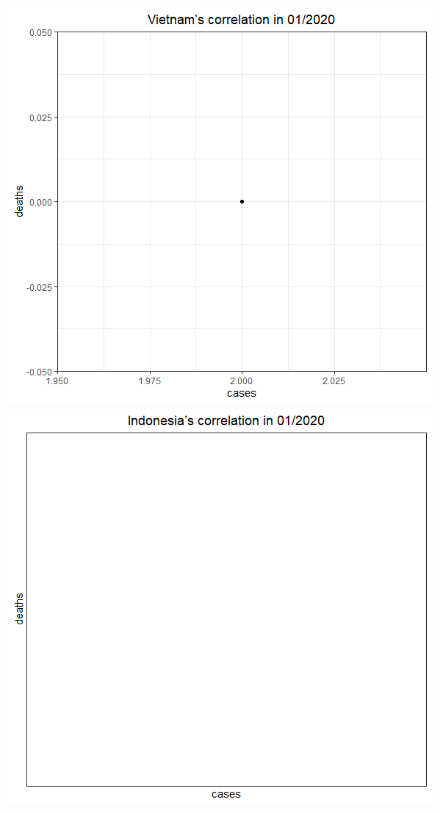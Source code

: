 \documentclass[a4paper]{article}
\theoremstyle{definition}
\begin{document}
\begin{enumerate}[1)]
    \begin{figure}[H]
    \begin{center}
        \includegraphics[scale = 0.3]{ix/ix.2/VN_01_2020.png}
        \includegraphics[scale = 0.3]{ix/ix.2/IDN_01_2020.png}

\end{center}
\end{figure}
\end{enumerate}
\end{document}
